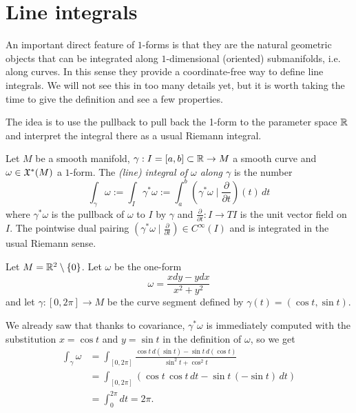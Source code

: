 \section{Line integrals}

An important direct feature of $1$-forms is that they are the natural geometric objects that can be integrated along $1$-dimensional (oriented) submanifolds, i.e. along curves.
In this sense they provide a coordinate-free way to define line integrals.
We will not see this in too many details yet, but it is worth taking the time to give the definition and see a few properties.

The idea is to use the pullback to pull back the 1-form to the parameter space $\mathbb{R}$ and interpret the integral there as a usual Riemann integral.

\begin{definition}
	Let $M$ be a smooth manifold, $\gamma: I = [a,b]\subset \mathbb{R} \to M$ a smooth curve and $\omega\in\mathfrak{X}^*(M)$ a $1$-form.
	The \emph{(line) integral of $\omega$ along $\gamma$} is the number
	\begin{equation}
		\int_\gamma \omega :=
		\int_I \gamma^*\omega :=
		\int_a^b \left(\gamma^*\omega \mid \frac{\partial}{\partial t}\right)(t)\, dt
	\end{equation}
	where $\gamma^*\omega$ is the pullback of $\omega$ to $I$ by $\gamma$ and $\frac{\partial}{\partial t}: I \to TI$ is the unit vector field on $I$.
	The pointwise dual pairing $\left(\gamma^*\omega \mid \frac{\partial}{\partial t}\right)\in C^\infty(I)$ and is integrated in the usual Riemann sense.
\end{definition}

\begin{example}\label{ex:li}
	Let $M=\mathbb{R}^2\setminus\{0\}$. Let $\omega$ be the one-form
	\begin{equation}
		\omega = \frac{x dy - y dx}{x^2 + y^2}
	\end{equation}
	and let $\gamma:[0,2\pi]\to M$ be the curve segment defined by $\gamma(t) = (\cos t, \sin t)$.

	We already saw that thanks to covariance, $\gamma^*\omega$ is immediately computed with the substitution $x=\cos t$ and $y=\sin t$ in the definition of $\omega$, so we get
	\begin{align}
		\int_\gamma \omega
		 & = \int_{[0,2\pi]} \frac{\cos t\, d(\sin t) - \sin t \, d(\cos t)}{\sin^2 t + \cos^2 t} \\
		 & = \int_{[0,2\pi]} (\cos t\, \cos t\, dt - \sin t \, (-\sin t)\, dt)                    \\
		 & = \int_0^{2\pi} dt = 2\pi.
	\end{align}
\end{example}

